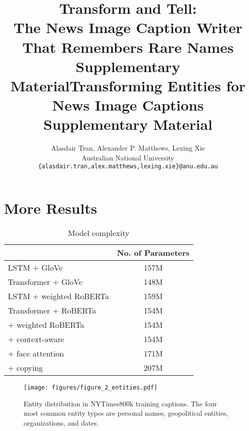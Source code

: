 \documentclass[10pt,twocolumn,letterpaper]{article}
\begin{document}
\title{Transform and Tell:\\The News Image Caption Writer That Remembers Rare Names\\Supplementary Material}
\title{Transforming Entities for News Image Captions\\Supplementary Material}

\author{Alasdair Tran, Alexander P. Matthews, Lexing Xie\\
Australian National University\\
{\tt\small \{alasdair.tran,alex.matthews,lexing.xie\}@anu.edu.au}
}

\maketitle

\section{More Results}

\begin{table}[t]
	\caption {Model complexity}
	\label{tab:models}
	\centering
	\begin{tabularx}{\linewidth}{Xc}
		\toprule
        & No. of Parameters \\
      \midrule
      LSTM + GloVe & 157M \\
      Transformer + GloVe & 148M \\
      LSTM + weighted RoBERTa & 159M \\
      \midrule
      Transformer + RoBERTa & 154M \\
      \quad + weighted RoBERTa & 154M \\
      \quad\quad + context-aware & 154M \\
      \quad\quad\quad + face attention & 171M \\
      \quad\quad\quad\quad + copying & 207M \\
		\bottomrule
	\end{tabularx}
\end{table}

\begin{figure}[t]
   \begin{center}
   \texttt{[image: figures/figure\_2\_entities.pdf]}
   \end{center}
      \caption{Entity distribution in NYTimes800k training captions. The four
               most common entity types are personal names, geopolitical
               entities, organizations, and dates.}
   \label{fig:entities}
\end{figure}
\end{document}
